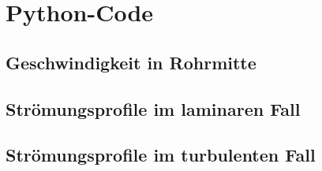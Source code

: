 %
\section{Python-Code}
\label{app:python}

\subsection{Geschwindigkeit in Rohrmitte}
\label{app:python:rohrmitte}



\subsection{Str\"omungsprofile im laminaren Fall}
\label{app:python:laminar}



\subsection{Str\"omungsprofile im turbulenten Fall}
\label{app:python:turbulent}


